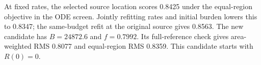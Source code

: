 At fixed rates, the selected source location scores 0.8425 under the equal-region objective in the ODE screen. Jointly refitting rates and initial burden lowers this to 0.8347; the same-budget refit at the original source gives 0.8563. The new candidate has $B=24872.6$ and $f=0.7992$. Its full-reference check gives area-weighted RMS 0.8077 and equal-region RMS 0.8359. This candidate starts with $R(0)=0$.
